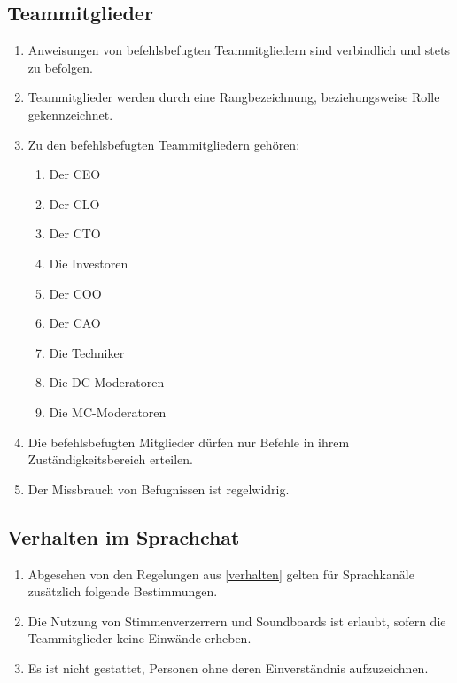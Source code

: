 \documentclass{article}
\begin{document}
\subsection{Teammitglieder}\label{members}
\begin{enumerate}[(1)]
	\item Anweisungen von befehlsbefugten Teammitgliedern sind verbindlich und stets zu befolgen.
	\item Teammitglieder werden durch eine Rangbezeichnung, beziehungsweise Rolle gekennzeichnet.
	\item Zu den befehlsbefugten Teammitgliedern gehören:
	\begin{enumerate}
		\item Der CEO
		\item Der CLO
		\item Der CTO
		\item Die Investoren
		\item Der COO
		\item Der CAO
		\item Die Techniker
		\item Die DC-Moderatoren
		\item Die MC-Moderatoren
	\end{enumerate}
	\item Die befehlsbefugten Mitglieder dürfen nur Befehle in ihrem Zuständigkeitsbereich erteilen.
	\item Der Missbrauch von Befugnissen ist regelwidrig.
\end{enumerate}

\subsection{Verhalten im Sprachchat}
\begin{enumerate}[(1)]
	\item Abgesehen von den Regelungen aus \ref{verhalten} gelten für Sprachkanäle zusätzlich folgende Bestimmungen.
	\item Die Nutzung von Stimmenverzerrern und Soundboards ist erlaubt, sofern die Teammitglieder keine Einwände erheben.
	\item Es ist nicht gestattet, Personen ohne deren Einverständnis aufzuzeichnen.
\end{enumerate}
\end{document}

